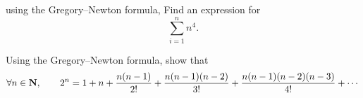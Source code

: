 \begin{exercise}
    using the Gregory--Newton formula,
    Find an expression for
    \[
        \sum_{i=1}^{n} n^4.
    \]
\end{exercise}

\begin{exercise}
    Using the Gregory--Newton formula,
    show that
    \[
        \forall n \in \mathbf N,
        \qquad 2^n = 1 + n + \frac{n(n-1)}{2!} + \frac{n(n-1)(n-2)}{3!} + \frac{n(n-1)(n-2)(n-3)}{4!} + \dotsb
    \]
\end{exercise}
